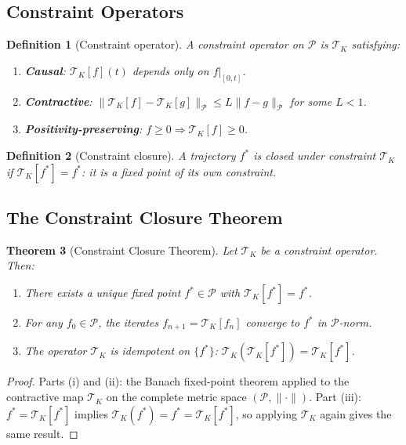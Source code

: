 \documentclass[12pt]{article}
\newtheorem{theorem}{Theorem}[section]
\newtheorem{definition}[theorem]{Definition}
\newcommand{\Pcal}{\mathcal{P}}
\begin{document}
\subsection{Constraint Operators}

\begin{definition}[Constraint operator]
A \emph{constraint operator} on $\Pcal$ is $\mathcal{T}_K$ satisfying:
\begin{enumerate}[label=(\roman*)]
  \item \textbf{Causal}: $\mathcal{T}_K[f](t)$ depends only on $f|_{[0,t]}$.
  \item \textbf{Contractive}: $\|\mathcal{T}_K[f] - \mathcal{T}_K[g]\|_\Pcal
    \leq L\|f-g\|_\Pcal$ for some $L < 1$.
  \item \textbf{Positivity-preserving}: $f \geq 0 \Rightarrow
    \mathcal{T}_K[f] \geq 0$.
\end{enumerate}
\end{definition}

\begin{definition}[Constraint closure]
A trajectory $f^*$ is \emph{closed under constraint $\mathcal{T}_K$} if
$\mathcal{T}_K[f^*] = f^*$: it is a fixed point of its own constraint.
\end{definition}

\subsection{The Constraint Closure Theorem}

\begin{theorem}[Constraint Closure Theorem]
\label{thm:closure}
Let $\mathcal{T}_K$ be a constraint operator. Then:
\begin{enumerate}[label=(\roman*)]
  \item There exists a unique fixed point $f^* \in \Pcal$ with
    $\mathcal{T}_K[f^*] = f^*$.
  \item For any $f_0 \in \Pcal$, the iterates $f_{n+1} = \mathcal{T}_K[f_n]$
    converge to $f^*$ in $\Pcal$-norm.
  \item The operator $\mathcal{T}_K$ is idempotent on $\{f^*\}$:
    $\mathcal{T}_K(\mathcal{T}_K[f^*]) = \mathcal{T}_K[f^*]$.
\end{enumerate}
\end{theorem}

\begin{proof}
Parts (i) and (ii): the Banach fixed-point theorem applied to the contractive
map $\mathcal{T}_K$ on the complete metric space $(\Pcal, \|\cdot\|)$.
Part (iii): $f^* = \mathcal{T}_K[f^*]$ implies $\mathcal{T}_K(f^*) =
f^* = \mathcal{T}_K[f^*]$, so applying $\mathcal{T}_K$ again gives the
same result.
\end{proof}
\end{document}

